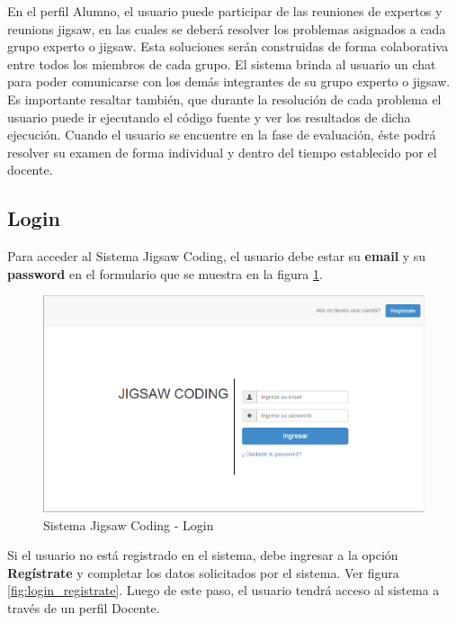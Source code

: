 En el perfil Alumno, el usuario puede participar de las reuniones de expertos y reunions jigsaw, en las cuales se deberá resolver los problemas asignados a cada grupo experto o jigsaw. Esta soluciones serán construidas de forma colaborativa entre todos los miembros de cada grupo. El sistema brinda al usuario un chat para poder comunicarse con los demás integrantes de su grupo experto o jigsaw. Es importante resaltar también, que durante la resolución de cada problema el usuario puede ir ejecutando el código fuente y ver los resultados de dicha ejecución. Cuando el usuario se encuentre en la fase de evaluación, éste podrá resolver su examen de forma individual y dentro del tiempo establecido por el docente.\\

\subsection{Login} 
Para acceder al Sistema Jigsaw Coding, el usuario debe estar su \textbf{email} y su \textbf{password} en el formulario que se muestra en la figura \ref{fig:sjc_login}.

\begin{figure}[h!]
	\centering
	\caption[SJC Login]{Sistema Jigsaw Coding - Login}
	\label{fig:sjc_login}
	\includegraphics[scale=0.4]{figuras/usodelsistema/login}	
\end{figure}

Si el usuario no está registrado en el sistema, debe ingresar a la opción \textbf{Regístrate} y completar los datos solicitados por el sistema. Ver figura \ref{fig:login_registrate}. Luego de este paso, el usuario tendrá acceso al sistema a través de un perfil Docente.\\

